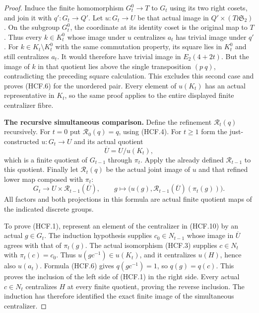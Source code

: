 \begin{proof}
Induce the finite homomorphism $G_t^0\to T$ to $G_t$
using its two right cosets, and join it with $q':G_t\to Q'$.
Let $u:G_t\to U$ be that actual image in
$Q'\times(T\wr\mathfrak S_2)$.  On the subgroup $G_t^0$,
the coordinate at its identity coset is the original map
to $T$.  Thus every $k\in K_t^0$ whose image under $u$
centralizes $a_t$ has trivial image under $q'$.
For $k\in K_t\setminus K_t^0$ with the same commutation
property, its square lies in $K_t^0$ and still centralizes
$a_t$.  It would therefore have trivial image in $E_2(4+2t)$.
But the image of $k$ in that quotient lies above the
single transposition $(p\ q)$, contradicting the preceding
square calculation.  This excludes this second case and
proves (HCF.6) for the unordered pair.
Every element of $u(K_t)$ has an actual representative in
$K_t$, so the same proof applies to the entire displayed
finite centralizer fibre.

\par\medskip\noindent\textbf{The recursive simultaneous comparison.}\quad
Define the refinement $\mathcal R_t(q)$ recursively.
For $t=0$ put $\mathcal R_0(q)=q$, using (HCF.4).
For $t\geq1$ form the just-constructed $u:G_t\to U$ and
its actual quotient
\[
                \overline U=U/u(K_t),                  \tag{HCF.9}
\]
which is a finite quotient of $G_{t-1}$ through $\pi_t$.
Apply the already defined $\mathcal R_{t-1}$ to this
quotient.  Finally let $\mathcal R_t(q)$ be the actual
joint image of $u$ and that refined lower map composed
with $\pi_t$:
\[
 G_t\longrightarrow
 U\times\mathcal R_{t-1}(\overline U),\qquad
 g\longmapsto\bigl(u(g),
             \mathcal R_{t-1}(\overline U)(\pi_t(g))\bigr).
                                                               \tag{HCF.10}
\]
All factors and both projections in this formula are actual
finite quotient maps of the indicated discrete groups.

To prove (HCF.1), represent an element of the centralizer
in (HCF.10) by an actual $g\in G_t$.  The induction
hypothesis supplies $c_0\in N_{t-1}$ whose image in
$\overline U$ agrees with that of $\pi_t(g)$.
The actual isomorphism (HCF.3) supplies $c\in N_t$
with $\pi_t(c)=c_0$.  Thus $u(gc^{-1})\in u(K_t)$,
and it centralizes $u(H)$, hence also $u(a_t)$.
Formula (HCF.6) gives $q(gc^{-1})=1$, so $q(g)=q(c)$.
This proves the inclusion of the left side of (HCF.1)
in the right side.  Every actual $c\in N_t$ centralizes
$H$ at every finite quotient, proving the reverse inclusion.
The induction has therefore identified the exact finite
image of the simultaneous centralizer.


\end{proof}
